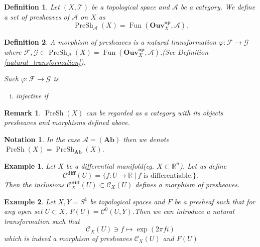 \documentclass{article}
\newtheorem{definition}{Definition}[section]
\newtheorem{notation}{Notation}[section]
\newtheorem{remark}{Remark}[section]
\newtheorem{example}{Example}[section]
\numberwithin{equation}{section}
\DeclareMathOperator{\PreSh}{PreSh}
\DeclareMathOperator{\Fun}{Fun}
\begin{document}
\begin{definition}
Let $(X,\mathcal{T})$ be a topological space and $\mathcal{A}$ be a category. We define a set of presheaves of $\mathcal{A}$ on $X$ as
\begin{equation*}
\PreSh_{\mathcal{A}}(X)=\Fun(\mathbf{Ouv}_X^{\mathbf{op}},\mathcal{A}).
\end{equation*}
\end{definition}

\begin{definition}
A morphism of presheaves is a natural transformation $\varphi:\mathcal{F}\to \mathcal{G}$ where $\mathcal{F},\mathcal{G}\in\PreSh_\mathcal{A}(X)=\Fun(\mathbf{Ouv}_X^{\mathbf{op}},\mathcal{A})$.(See Definition \ref{natural_transformation}).\\
\par Such $\varphi:\mathcal{F}\to\mathcal{G}$ is 
\begin{enumerate}[i).]
\item injective if 
\end{enumerate}
\end{definition}



\begin{remark}
$\PreSh(X)$ can be regarded as a category with its objects presheaves and morphisms defined above. 
\end{remark}

\begin{notation}
In the case $\mathcal{A}= (\mathbf{Ab})$ then we denote $\PreSh(X)=\PreSh_{\mathbf{Ab}}(X)$.
\end{notation}

\begin{example}
Let $X$ be a differential manifold(eg. $X\subset\mathbb{R}^n$). Let us define 
\begin{equation*}
\mathcal{C}^{\mathbf{diff}}(U) = \{f:U\to\mathbb{R}\:|\:f\text{ is differentiable.}\}. 
\end{equation*}
Then the inclusions $\mathcal{C}_X^{\mathbf{diff}}(U)\subset\mathcal{C}_X(U)$ defines a morphism of presheaves.
\end{example}

\begin{example}
Let $X,Y=S^1$ be topological spaces and $F$ be a presheaf such that for any open set $U\subset X$, $F(U)=\mathcal{C}^0(U,Y)$.Then we can introduce a natural transformation such that 
\begin{equation*}
\mathcal{C}_X(U)\ni f\mapsto \exp(2\pi fi)
\end{equation*}
which is indeed a morphism of presheaves $\mathcal{C}_X(U)$ and $F(U)$
\end{example}
\end{document}
